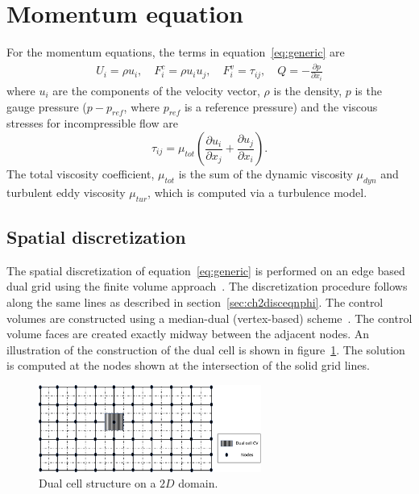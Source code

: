 \section{Momentum equation}\label{sec:momeq}
For the momentum equations, the terms in equation~\ref{eq:generic} are 
\begin{align}
    U_i = \rho u_i,\quad
    F^c_i = 
           \rho u_i u_j,\quad
    F^v_i = 
           \tau_{ij},\quad
    Q = -\frac{\partial p}{\partial x_i}
\end{align}
where $u_i$ are the components of the velocity vector, $\rho$ is the density, $p$ is the gauge pressure ($p - p_{ref}$, where $p_{ref}$ is a reference pressure) and the viscous stresses for incompressible flow are 
\begin{equation}
\tau_{ij}=\mu_{tot}\left(\frac{\partial u_i}{\partial x_j} + \frac{\partial u_j}{\partial x_i} \right).
\label{eq:viscstress}
\end{equation} 
The total viscosity coefficient, $\mu_{tot}$ is the sum of the dynamic viscosity $\mu_{dyn}$ and turbulent eddy viscosity $\mu_{tur}$, which is computed via a turbulence model. 

\subsection{Spatial discretization}\label{ssec:spdisc}

The spatial discretization of equation~\ref{eq:generic} is performed on an edge based dual grid using the finite volume approach~\cite{Moukalled, Ferziger2002, BLAZEK}. The discretization procedure follows along the same lines as described in section~\ref{sec:ch2disceqnphi}. The control volumes are constructed using a median-dual (vertex-based) scheme~\cite{barth1992aspects, SU22014}. The control volume faces are created exactly midway between the adjacent nodes. An illustration of the construction of the dual cell is shown in figure~\ref{fig:dualcell}. The solution is computed at the nodes shown at the intersection  of the solid grid lines. 
\begin{figure}[h]
\centering
\captionsetup{justification=centering}
 \includegraphics[width=0.65\textwidth]{ch3_su2eqn/figures/dual_cell_nodes.png}
\caption{Dual cell structure on a $2D$ domain.}
 \label{fig:dualcell}
\end{figure}

